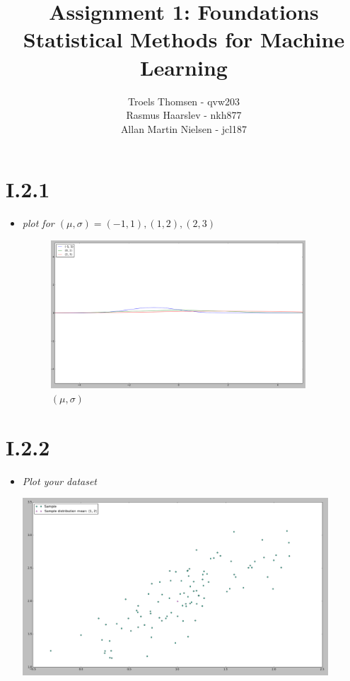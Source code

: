 \documentclass[12pt, a4paper]{article}
\title{Assignment 1: Foundations\\Statistical Methods for Machine Learning}
\author{Troels Thomsen - qvw203\\Rasmus Haarslev - nkh877\\Allan Martin Nielsen - jcl187}
\begin{document}
\pagestyle{empty}
\maketitle
\newpage

\pagestyle{fancy}

\section{I.2.1}
\begin{itemize}
\item \textit{plot for $(\mu, \sigma) = {(-1, 1), (1, 2), (2, 3)}$}
\begin{figure}[!h]
    \centering
    \includegraphics[width=0.9\textwidth]{1.png}
    \caption{$(\mu, \sigma)$}
    \label{fig:awesome_image}
\end{figure}
\end{itemize}

\section{I.2.2}
\begin{itemize}
\item \textit{Plot your dataset}

\includegraphics[width=0.9\textwidth]{2.png}
\end{itemize}
\end{document}
